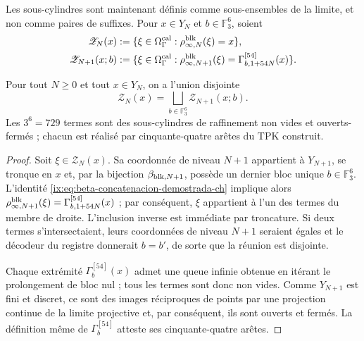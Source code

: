 Les sous-cylindres sont maintenant définis comme sous-ensembles de la limite, et non comme paires
de suffixes. Pour \(x\in Y_N\) et \(b\in\mathbb F_3^6\), soient
\begin{align}
 \mathscr Z_N(x)
   &:=\{\xi\in\Omega_\Gamma^{\rm cal}:
       \rho^{\rm blk}_{\infty,N}(\xi)=x\},
 \label{ix:eq:cilindro-real-limite-ch}\\
 \mathscr Z_{N+1}(x;b)
   &:=\{\xi\in\Omega_\Gamma^{\rm cal}:
       \rho^{\rm blk}_{\infty,N+1}(\xi)
       =\Gamma_{b,1+54N}^{[54]}(x)\}.
 \label{ix:eq:subcilindro-real-limite-ch}
\end{align}

\begin{theorem}
\label{ix:thm:particion-729-subcilindros-ch}
Pour tout \(N\ge0\) et tout \(x\in Y_N\), on a l’union disjointe
\begin{equation}
 \mathscr Z_N(x)=
 \bigsqcup_{b\in\mathbb F_3^6}\mathscr Z_{N+1}(x;b).
 \label{ix:eq:particion-real-729-ch}
\end{equation}
Les \(3^6=729\) termes sont des sous-cylindres de raffinement non vides et
ouverts-fermés ; chacun est réalisé par cinquante-quatre arêtes du TPK
construit.
\end{theorem}

\begin{proof}
Soit \(\xi\in\mathscr Z_N(x)\). Sa coordonnée de niveau \(N+1\) appartient à \(Y_{N+1}\), se tronque en \(x\) et, par la bijection \(\beta_{{\rm blk},N+1}\), possède un dernier bloc unique \(b\in\mathbb F_3^6\). L'identité \eqref{ix:eq:beta-concatenacion-demostrada-ch} implique alors \(\rho^{\rm blk}_{\infty,N+1}(\xi)
=\Gamma_{b,1+54N}^{[54]}(x)\) ; par conséquent, \(\xi\) appartient à l'un des termes du membre de droite. L'inclusion inverse est immédiate par troncature. Si deux termes s'intersectaient, leurs coordonnées de niveau \(N+1\) seraient égales et le décodeur du registre donnerait \(b=b'\), de sorte que la réunion est disjointe.

Chaque extrémité \(\Gamma_b^{[54]}(x)\) admet une queue infinie obtenue
en itérant le prolongement de bloc nul ; tous les termes sont donc non
vides. Comme \(Y_{N+1}\) est fini et discret, ce sont des images réciproques de points par
une projection continue de la limite projective et, par conséquent, ils sont ouverts et fermés. La
définition même de \(\Gamma_b^{[54]}\) atteste ses cinquante-quatre arêtes.
\end{proof}

